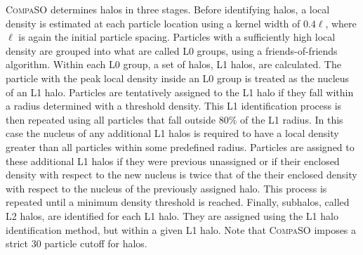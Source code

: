\textsc{CompaSO} determines halos in three stages. Before identifying halos, a local density is estimated at each particle location using a kernel width of $0.4\ell$, where $\ell$ is again the initial particle spacing. Particles with a sufficiently high local density are grouped into what are called L0 groups, using a friends-of-friends algorithm. Within each L0 group, a set of halos, L1 halos, are calculated. The particle with the peak local density inside an L0 group is treated as the nucleus of an L1 halo. Particles are tentatively assigned to the L1 halo if they fall within a radius determined with a threshold density. This L1 identification process is then repeated using all particles that fall outside 80\% of the L1 radius. In this case the nucleus of any additional L1 halos is required to have a local density greater than all particles within some predefined radius. Particles are assigned to these additional L1 halos if they were previous unassigned or if their enclosed density with respect to the new nucleus is twice that of the their enclosed density with respect to the nucleus of the previously assigned halo. This process is repeated until a minimum density threshold is reached. Finally, subhalos, called L2 halos, are identified for each L1 halo. They are assigned using the L1 halo identification method, but within a given L1 halo. Note that \textsc{CompaSO} imposes a strict $30$ particle cutoff for halos.

